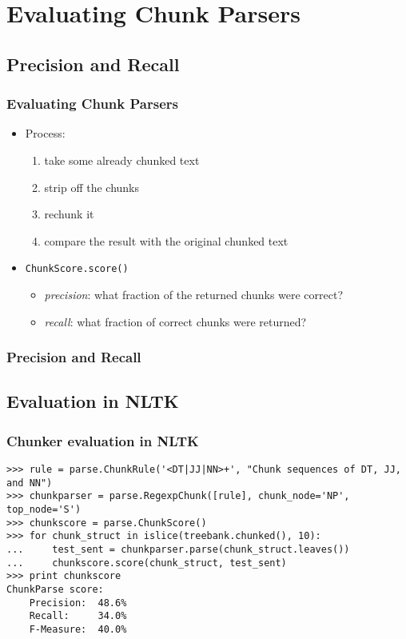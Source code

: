 \documentclass{beamer}             %
\begin{document}
\section{Evaluating Chunk Parsers}

\subsection{Precision and Recall}

\begin{frame}
  \frametitle{Evaluating Chunk Parsers}

  \begin{itemize}
  \item Process:
    \begin{enumerate}
    \item take some already chunked text
    \item strip off the chunks
    \item rechunk it
    \item compare the result with the original chunked text
    \end{enumerate}
  \item \texttt{ChunkScore.score()}
    \begin{itemize}
    \item \textit{precision}: what fraction of the returned chunks were correct?
    \item \textit{recall}: what fraction of correct chunks were returned?
    \end{itemize}
  \end{itemize}
\end{frame}

\begin{frame}
  \frametitle{Precision and Recall}
  \centerline{}
\end{frame}

\subsection{Evaluation in NLTK}

\begin{frame}[fragile]
  \frametitle{Chunker evaluation in NLTK}
  \scriptsize

\begin{verbatim}
>>> rule = parse.ChunkRule('<DT|JJ|NN>+', "Chunk sequences of DT, JJ, and NN")
>>> chunkparser = parse.RegexpChunk([rule], chunk_node='NP', top_node='S')
>>> chunkscore = parse.ChunkScore()
>>> for chunk_struct in islice(treebank.chunked(), 10):
...     test_sent = chunkparser.parse(chunk_struct.leaves())
...     chunkscore.score(chunk_struct, test_sent)
>>> print chunkscore
ChunkParse score:
    Precision:  48.6%
    Recall:     34.0%
    F-Measure:  40.0%
\end{verbatim}
\end{frame}
\end{document}
